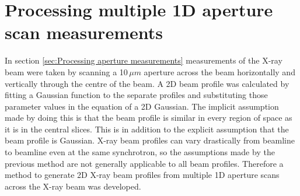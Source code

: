 \section{Processing multiple 1D aperture scan measurements}
\label{sec:Processing multiple 1D aperture scan measurements}
In section \ref{sec:Processing aperture measurements} measurements of the X-ray beam were taken by scanning a 10$\,\mu m$ aperture across the beam horizontally and vertically through the centre of the beam.
A 2D beam profile was calculated by fitting a Gaussian function to the separate profiles and substituting those parameter values in the equation of a 2D Gaussian.
The implicit assumption made by doing this is that the beam profile is similar in every region of space as it is in the central slices.
This is in addition to the explicit assumption that the beam profile is Gaussian.
X-ray beam profiles can vary drastically from beamline to beamline even at the same synchrotron, so the assumptions made by the previous method are not generally applicable to all beam profiles.
Therefore a method to generate 2D X-ray beam profiles from multiple 1D aperture scans across the X-ray beam was developed.

